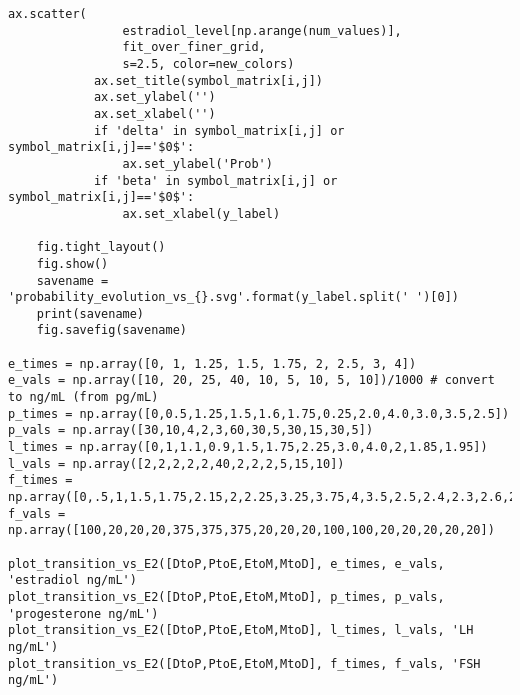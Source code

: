 \documentclass[11pt]{article}
\begin{document}
\begin{Verbatim}[frame=single]
            ax.scatter(
                estradiol_level[np.arange(num_values)],
                fit_over_finer_grid,
                s=2.5, color=new_colors)
            ax.set_title(symbol_matrix[i,j])
            ax.set_ylabel('')
            ax.set_xlabel('')
            if 'delta' in symbol_matrix[i,j] or symbol_matrix[i,j]=='$0$':
                ax.set_ylabel('Prob')
            if 'beta' in symbol_matrix[i,j] or symbol_matrix[i,j]=='$0$':
                ax.set_xlabel(y_label)
                
    fig.tight_layout()
    fig.show()
    savename = 'probability_evolution_vs_{}.svg'.format(y_label.split(' ')[0])
    print(savename)
    fig.savefig(savename)
    
e_times = np.array([0, 1, 1.25, 1.5, 1.75, 2, 2.5, 3, 4])
e_vals = np.array([10, 20, 25, 40, 10, 5, 10, 5, 10])/1000 # convert to ng/mL (from pg/mL)
p_times = np.array([0,0.5,1.25,1.5,1.6,1.75,0.25,2.0,4.0,3.0,3.5,2.5])
p_vals = np.array([30,10,4,2,3,60,30,5,30,15,30,5])
l_times = np.array([0,1,1.1,0.9,1.5,1.75,2.25,3.0,4.0,2,1.85,1.95])
l_vals = np.array([2,2,2,2,2,40,2,2,2,5,15,10])
f_times = np.array([0,.5,1,1.5,1.75,2.15,2,2.25,3.25,3.75,4,3.5,2.5,2.4,2.3,2.6,2.7])
f_vals = np.array([100,20,20,20,375,375,375,20,20,20,100,100,20,20,20,20,20])

plot_transition_vs_E2([DtoP,PtoE,EtoM,MtoD], e_times, e_vals, 'estradiol ng/mL')
plot_transition_vs_E2([DtoP,PtoE,EtoM,MtoD], p_times, p_vals, 'progesterone ng/mL')
plot_transition_vs_E2([DtoP,PtoE,EtoM,MtoD], l_times, l_vals, 'LH ng/mL')
plot_transition_vs_E2([DtoP,PtoE,EtoM,MtoD], f_times, f_vals, 'FSH ng/mL')
\end{Verbatim}




\end{document}
